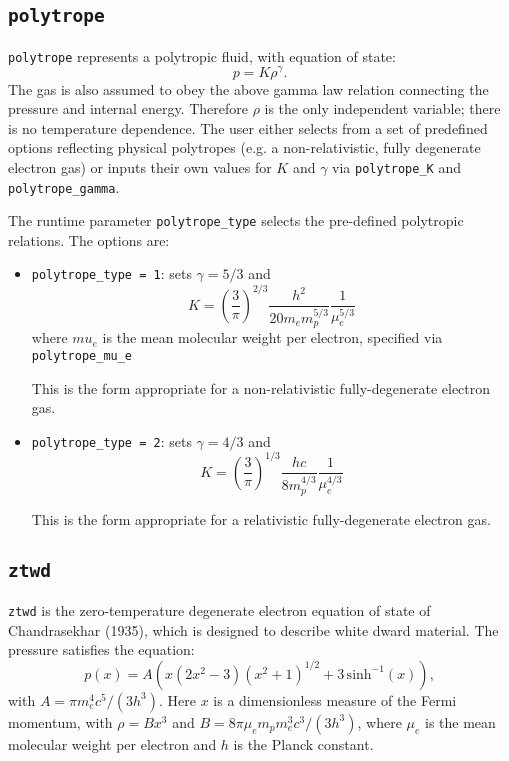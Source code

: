 \subsection{\tt polytrope}

{\tt polytrope} represents a polytropic fluid, with equation of
  state:
\begin{equation}
  p = K \rho^\gamma.
\end{equation}
The gas is also assumed to obey the above gamma law relation
connecting the pressure and internal energy. Therefore $\rho$ is the
only independent variable; there is no temperature dependence. The
user either selects from a set of predefined options reflecting
physical polytropes (e.g. a non-relativistic, fully degenerate
electron gas) or inputs their own values for $K$ and $\gamma$
via {\tt polytrope\_K} and {\tt polytrope\_gamma}.

The runtime parameter {\tt polytrope\_type} selects the pre-defined
polytropic relations.  The options are:
\begin{itemize}
  \item {\tt polytrope\_type = 1}: sets $\gamma = 5/3$ and
    \begin{equation}
      K = \left ( \frac{3}{\pi} \right)^{2/3} \frac{h^2}{20 m_e m_p^{5/3}} \frac{1}{\mu_e^{5/3}}
    \end{equation}
    where $mu_e$ is the mean molecular weight per electron, specified via {\tt polytrope\_mu\_e}

    This is the form appropriate for a non-relativistic
    fully-degenerate electron gas.

  \item {\tt polytrope\_type = 2}: sets $\gamma = 4/3$ and
    \begin{equation}
      K = \left ( \frac{3}{\pi} \right)^{1/3} \frac{hc}{8 m_p^{4/3}} \frac{1}{\mu_e^{4/3}}
    \end{equation}

    This is the form appropriate for a relativistic fully-degenerate
    electron gas.

\end{itemize}


\subsection{\tt ztwd}

{\tt ztwd} is the zero-temperature degenerate electron equation
  of state of Chandrasekhar (1935), which is designed to describe
  white dward material. The pressure satisfies the equation:
\begin{equation}
  p(x) = A \left( x(2x^2-3)(x^2 + 1)^{1/2} + 3\, \text{sinh}^{-1}(x) \right),
\end{equation}
with $A = \pi m_e^4 c^5 / (3 h^3)$. Here $x$ is a dimensionless
measure of the Fermi momentum, with $\rho = B x^3$ and $B = 8\pi \mu_e
m_p m_e^3 c^3 / (3h^3)$, where $\mu_e$ is the mean molecular weight
per electron and $h$ is the Planck constant. 

